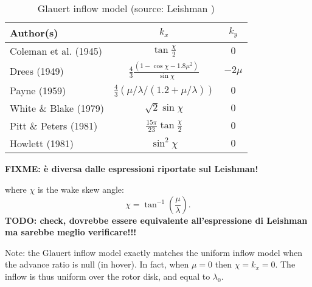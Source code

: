 \begin{table}[h]
\centering
\caption{Glauert inflow model (source: Leishman \cite{LEISHMAN-2006})}\label{tab:GlauertCoeff}
\begin{tabular}{l|c|c}
\textbf{Author(s)} & $k_x$ & $k_y$\\
\hline
Coleman et al. (1945)	&	
$\tan{\frac{\chi}{2}}$	&	$0$\\
Drees (1949)		&	
$\frac{4}{3}\frac{\left( 1 - \cos{\chi} -1.8 \mu^2\right)}{\sin{\chi}} $	&	$-2 \mu$\\
Payne (1959)		&
$\frac{4}{3} ( \mu/ \lambda/ (1.2 + \mu/\lambda))$	&	$0$\\
White \& Blake (1979)	&
$\sqrt{2} \sin{\chi}$	&	$0$\\
Pitt \& Peters (1981)	&
$\frac{15 \pi}{23} \tan{\frac{\chi}{2}}$	&	$0$\\
Howlett (1981)		&
$ \sin^2{\chi}$	&	$0$\\
\hline
\end{tabular}
\end{table}

\textbf{FIXME: \`e diversa dalle espressioni riportate sul Leishman!}

where $\chi$ is the wake skew angle:
\begin{equation}
\chi = \tan^{-1}\left( \frac{\mu}{\lambda} \right).
\end{equation}
\textbf{TODO: check, dovrebbe essere equivalente all'espressione di Leishman ma
sarebbe meglio verificare!!!}

Note: the Glauert inflow model exactly matches the uniform inflow model
when the advance ratio is null (in hover).
In fact, when $\mu = 0$ then $\chi = k_x = 0$.
The inflow is thus uniform over the rotor disk, and equal to $\lambda_0$.

